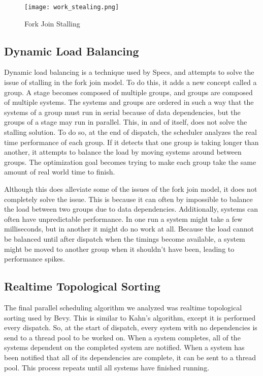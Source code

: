 \documentclass[conference]{IEEEtran}
\begin{document}
\begin{figure}
    \begin{center}
    \centerline{\texttt{[image: work\_stealing.png]}}
    \caption[test]{Fork Join Stalling}
    \label{ECS Archetype}
    \end{center}
\end{figure}

\subsection{Dynamic Load Balancing}

Dynamic load balancing is a technique used by Specs, and attempts to solve the issue of stalling in the fork join model. To do this, it adds a new concept called a group. A stage becomes composed of multiple groups, and groups are composed of multiple systems. The systems and groups are ordered in such a way that the systems of a group must run in serial because of data dependencies, but the groups of a stage may run in parallel. This, in and of itself, does not solve the stalling solution. To do so, at the end of dispatch, the scheduler analyzes the real time performance of each group. If it detects that one group is taking longer than another, it attempts to balance the load by moving systems around between groups. The optimization goal becomes trying to make each group take the same amount of real world time to finish. 

Although this does alleviate some of the issues of the fork join model, it does not completely solve the issue. This is because it can often by impossible to balance the load between two groups due to data dependencies. Additionally, systems can often have unpredictable performance. In one run a system might take a few milliseconds, but in another it might do no work at all. Because the load cannot be balanced until after dispatch when the timings become available, a system might be moved to another group when it shouldn't have been, leading to performance spikes.

\subsection{Realtime Topological Sorting}

The final parallel scheduling algorithm we analyzed was realtime topological sorting used by Bevy. This is similar to Kahn's algorithm, except it is performed every dispatch. So, at the start of dispatch, every system with no dependencies is send to a thread pool to be worked on. When a system completes, all of the systems dependent on the completed system are notified. When a system has been notified that all of its dependencies are complete, it can be sent to a thread pool. This process repeats until all systems have finished running.
\end{document}
